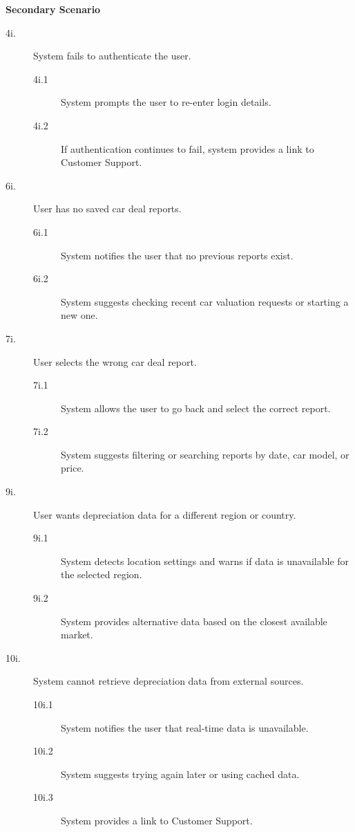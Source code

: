 \documentclass[]{article}
\begin{document}
\begin{enumerate}[{\bf {BE}1.}]
	\textbf{Secondary Scenario}

	\begin{description}
		\item[4i.] System fails to authenticate the user.
		\begin{description}
			\item[4i.1] System prompts the user to re-enter login details.
			\item[4i.2] If authentication continues to fail, system provides a link to Customer Support.
		\end{description}

		\item[6i.] User has no saved car deal reports.
		\begin{description}
			\item[6i.1] System notifies the user that no previous reports exist.
			\item[6i.2] System suggests checking recent car valuation requests or starting a new one.
		\end{description}

		\item[7i.] User selects the wrong car deal report.
		\begin{description}
			\item[7i.1] System allows the user to go back and select the correct report.
			\item[7i.2] System suggests filtering or searching reports by date, car model, or price.
		\end{description}

		\item[9i.] User wants depreciation data for a different region or country.
		\begin{description}
			\item[9i.1] System detects location settings and warns if data is unavailable for the selected region.
			\item[9i.2] System provides alternative data based on the closest available market.
		\end{description}

		\item[10i.] System cannot retrieve depreciation data from external sources.
		\begin{description}
			\item[10i.1] System notifies the user that real-time data is unavailable.
			\item[10i.2] System suggests trying again later or using cached data.
			\item[10i.3] System provides a link to Customer Support.
		\end{description}
	\end{description}


\end{enumerate}
\end{document}
